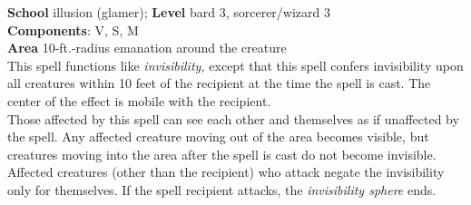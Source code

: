 \textbf{School} illusion (glamer); \textbf{Level} bard 3, sorcerer/wizard 3\\
\textbf{Components}: V, S, M\\
\textbf{Area} 10-ft.-radius emanation around the creature\\
This spell functions like \textit{invisibility, }except that this spell confers invisibility upon all creatures within 10 feet of the recipient at the time the spell is cast. The center of the effect is mobile with the recipient.\\
Those affected by this spell can see each other and themselves as if unaffected by the spell. Any affected creature moving out of the area becomes visible, but creatures moving into the area after the spell is cast do not become invisible. Affected creatures (other than the recipient) who attack negate the invisibility only for themselves. If the spell recipient attacks, the \textit{invisibility sphere }ends.\\
